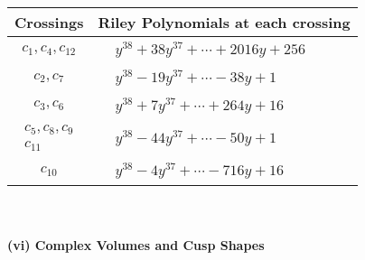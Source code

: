 \documentclass[1p]{elsarticle_modified}
\theoremstyle{definition}
\begin{document}
\begin{tabular}{m{50pt}|m{274pt}}
Crossings & \hspace{64pt}Riley Polynomials at each crossing \\
\hline $$\begin{aligned}c_{1},c_{4},c_{12}\end{aligned}$$&$\begin{aligned}
&y^{38}+38 y^{37}+\cdots+2016 y+256
\end{aligned}$\\
\hline $$\begin{aligned}c_{2},c_{7}\end{aligned}$$&$\begin{aligned}
&y^{38}-19 y^{37}+\cdots-38 y+1
\end{aligned}$\\
\hline $$\begin{aligned}c_{3},c_{6}\end{aligned}$$&$\begin{aligned}
&y^{38}+7 y^{37}+\cdots+264 y+16
\end{aligned}$\\
\hline $$\begin{aligned}c_{5},c_{8},c_{9}\\c_{11}\end{aligned}$$&$\begin{aligned}
&y^{38}-44 y^{37}+\cdots-50 y+1
\end{aligned}$\\
\hline $$\begin{aligned}c_{10}\end{aligned}$$&$\begin{aligned}
&y^{38}-4 y^{37}+\cdots-716 y+16
\end{aligned}$\\
\hline
\end{tabular}\\~\\
\newpage\flushleft \textbf{(vi) Complex Volumes and Cusp Shapes}
\end{document}
